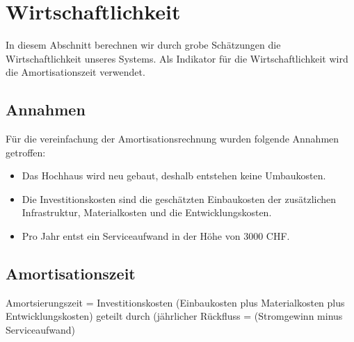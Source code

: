 \section{Wirtschaftlichkeit} \label{sec:wirtschaftlichkeit}
In diesem Abschnitt berechnen wir durch grobe Schätzungen die Wirtschaftlichkeit unseres Systems. 
Als Indikator für die Wirtschaftlichkeit wird die Amortisationszeit verwendet.
\subsection{Annahmen}
Für die vereinfachung der Amortisationsrechnung wurden folgende Annahmen getroffen:\\
\begin{itemize}  
\item Das Hochhaus wird neu gebaut, deshalb entstehen keine Umbaukosten.
\item Die Investitionskosten sind die geschätzten Einbaukosten der zusätzlichen Infrastruktur, Materialkosten und die Entwicklungskosten.
\item Pro Jahr entst ein Serviceaufwand in der Höhe von 3000 CHF.
\end{itemize}

\subsection{Amortisationszeit}
Amortsierungszeit = Investitionskosten (Einbaukosten plus Materialkosten plus Entwicklungskosten) geteilt durch (jährlicher Rückfluss = (Stromgewinn minus Serviceaufwand)
